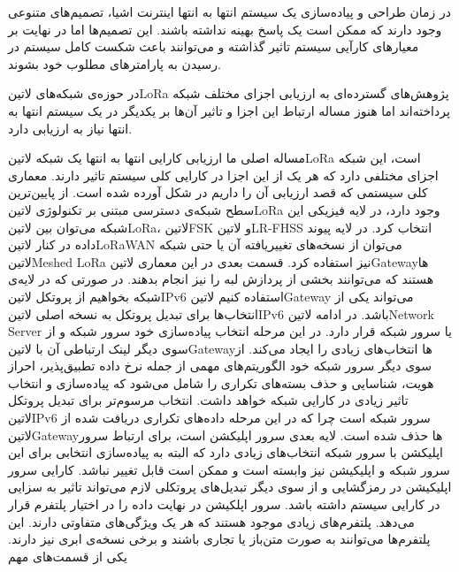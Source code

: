 
در زمان طراحی و پیاده‌سازی یک سیستم انتها به انتها اینترنت اشیا، تصمیم‌های متنوعی وجود دارند که ممکن است
یک پاسخ بهینه نداشته باشند. این تصمیم‌ها اما در نهایت بر معیارهای کارآیی سیستم تاثیر گذاشته و می‌توانند
باعث شکست کامل سیستم در رسیدن به پارامترهای مطلوب خود بشوند.

در حوزه‌ی شبکه‌های ‌لاتین{LoRa} پژوهش‌های گسترده‌ای به ارزیابی اجزای مختلف شبکه پرداخته‌اند اما هنوز
مساله ارتباط این اجزا و تاثیر آن‌ها بر یکدیگر در یک سیستم انتها به انتها نیاز به ارزیابی دارد.


مساله اصلی ما ارزیابی کارایی انتها به انتها یک شبکه ‌لاتین{LoRa} است، این شبکه اجزای مختلفی دارد که هر یک از این اجزا در کارایی کلی سیستم تاثیر دارند.
معماری کلی سیستمی که قصد ارزیابی آن را داریم در شکل  آورده شده است.
از پایین‌ترین سطح شبکه‌ی دسترسی مبتنی بر تکنولوژی ‌لاتین{LoRa} وجود دارد، در لایه فیزیکی این شبکه می‌توان بین ‌لاتین{LoRa}، ‌لاتین{FSK}
و ‌لاتین{LR-FHSS} انتخاب کرد. در لایه پیوند داده در کنار ‌لاتین{LoRaWAN} می‌توان از نسخه‌های تغییریافته آن یا حتی شبکه ‌لاتین{Meshed LoRa} نیز استفاده کرد.
قسمت بعدی در این معماری ‌لاتین{Gateway}ها هستند که می‌توانند بخشی از پردازش لبه را نیز انجام بدهند. در صورتی که در لایه‌ی شبکه بخواهیم از پروتکل ‌لاتین{IPv6} استفاده کنیم
‌لاتین{Gateway} می‌تواند یکی از انتخاب‌ها برای تبدیل پروتکل به نسخه اصلی ‌لاتین{IPv6} باشد.
در ادامه ‌لاتین{Network Server} یا سرور شبکه قرار دارد. در این مرحله انتخاب پیاده‌سازی خود سرور شبکه و از سوی دیگر لینک ارتباطی آن با
‌لاتین{Gateway}ها انتخاب‌های زیادی را ایجاد می‌کند. از سوی دیگر سرور شبکه خود الگوریتم‌های مهمی از جمله نرخ داده تطبیق‌پذیر، احراز هویت، شناسایی و حذف بسته‌های تکراری را شامل می‌شود
که پیاده‌سازی و انتخاب تاثیر زیادی در کارایی شبکه خواهد داشت. انتخاب مرسوم‌تر برای تبدیل پروتکل ‌لاتین{IPv6} سرور شبکه است چرا که در این مرحله داده‌های تکراری دریافت شده از
‌لاتین{Gateway}ها حذف شده است.
لایه بعدی سرور اپلیکشن است، برای ارتباط سرور اپلیکشن با سرور شبکه انتخاب‌های زیادی دارد که البته به پیاده‌سازی انتخابی برای این سرور شبکه و اپلیکیشن نیز وابسته است
و ممکن است قابل تغییر نباشد. کارایی سرور اپلیکیشن در رمزگشایی و از سوی دیگر تبدیل‌های پروتکلی لازم می‌تواند تاثیر به سزایی در کارایی سیستم داشته باشد.
سرور اپلکیشن در نهایت داده را در اختیار پلتفرم قرار می‌دهد. پلتفرم‌های زیادی موجود هستند که هر یک ویژگی‌های متفاوتی دارند.
این پلتفرم‌ها می‌توانند به صورت متن‌باز یا تجاری باشند و برخی نسخه‌ی ابری نیز دارند.
یکی از قسمت‌های مهم
